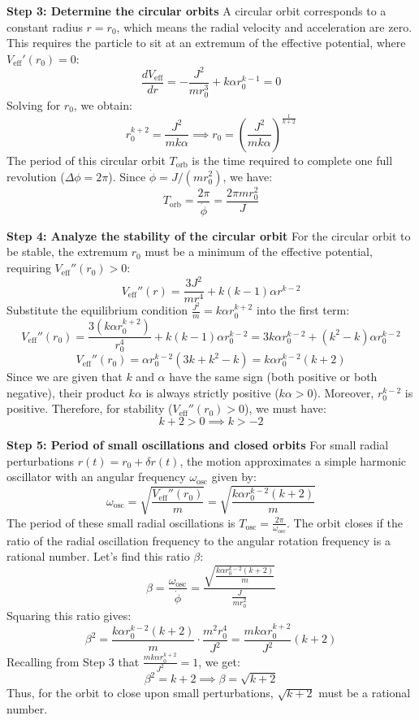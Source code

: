 \begin{solution}
\textbf{Step 3: Determine the circular orbits}
A circular orbit corresponds to a constant radius $r = r_0$, which means the radial velocity and acceleration are zero. This requires the particle to sit at an extremum of the effective potential, where $V_{\text{eff}}'(r_0) = 0$:
\[ \frac{d V_{\text{eff}}}{dr} = -\frac{J^2}{mr_0^3} + k\alpha r_0^{k-1} = 0 \]
Solving for $r_0$, we obtain:
\[ r_0^{k+2} = \frac{J^2}{mk\alpha} \implies r_0 = \left( \frac{J^2}{mk\alpha} \right)^{\frac{1}{k+2}} \]
The period of this circular orbit $T_{\text{orb}}$ is the time required to complete one full revolution ($\Delta \phi = 2\pi$). Since $\dot{\phi} = J / (mr_0^2)$, we have:
\[ T_{\text{orb}} = \frac{2\pi}{\dot{\phi}} = \frac{2\pi m r_0^2}{J} \]

\textbf{Step 4: Analyze the stability of the circular orbit}
For the circular orbit to be stable, the extremum $r_0$ must be a minimum of the effective potential, requiring $V_{\text{eff}}''(r_0) > 0$:
\[ V_{\text{eff}}''(r) = \frac{3J^2}{mr^4} + k(k-1)\alpha r^{k-2} \]
Substitute the equilibrium condition $\frac{J^2}{m} = k\alpha r_0^{k+2}$ into the first term:
\[ V_{\text{eff}}''(r_0) = \frac{3(k\alpha r_0^{k+2})}{r_0^4} + k(k-1)\alpha r_0^{k-2} = 3k\alpha r_0^{k-2} + (k^2 - k)\alpha r_0^{k-2} \]
\[ V_{\text{eff}}''(r_0) = \alpha r_0^{k-2} (3k + k^2 - k) = k\alpha r_0^{k-2} (k + 2) \]
Since we are given that $k$ and $\alpha$ have the same sign (both positive or both negative), their product $k\alpha$ is always strictly positive ($k\alpha > 0$). Moreover, $r_0^{k-2}$ is positive. Therefore, for stability ($V_{\text{eff}}''(r_0) > 0$), we must have:
\[ k + 2 > 0 \implies k > -2 \]

\textbf{Step 5: Period of small oscillations and closed orbits}
For small radial perturbations $r(t) = r_0 + \delta r(t)$, the motion approximates a simple harmonic oscillator with an angular frequency $\omega_{\text{osc}}$ given by:
\[ \omega_{\text{osc}} = \sqrt{\frac{V_{\text{eff}}''(r_0)}{m}} = \sqrt{\frac{k\alpha r_0^{k-2}(k+2)}{m}} \]
The period of these small radial oscillations is $T_{\text{osc}} = \frac{2\pi}{\omega_{\text{osc}}}$.
The orbit closes if the ratio of the radial oscillation frequency to the angular rotation frequency is a rational number. Let's find this ratio $\beta$:
\[ \beta = \frac{\omega_{\text{osc}}}{\dot{\phi}} = \frac{ \sqrt{ \frac{k\alpha r_0^{k-2}(k+2)}{m} } }{ \frac{J}{mr_0^2} } \]
Squaring this ratio gives:
\[ \beta^2 = \frac{k\alpha r_0^{k-2}(k+2)}{m} \cdot \frac{m^2 r_0^4}{J^2} = \frac{mk\alpha r_0^{k+2}}{J^2} (k+2) \]
Recalling from Step 3 that $\frac{mk\alpha r_0^{k+2}}{J^2} = 1$, we get:
\[ \beta^2 = k + 2 \implies \beta = \sqrt{k+2} \]
Thus, for the orbit to close upon small perturbations, $\sqrt{k+2}$ must be a rational number.


\end{solution}
